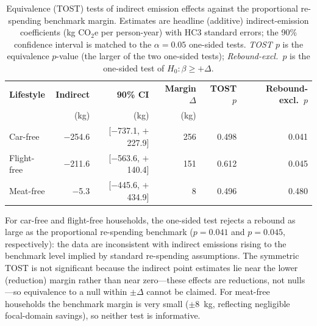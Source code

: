 \documentclass[12pt]{article}
\begin{document}
\begin{table}[!htbp]
\centering
\small
\caption{Equivalence (TOST) tests of indirect emission effects against the proportional re-spending benchmark margin. Estimates are headline (additive) indirect-emission coefficients (kg CO$_2$e per person-year) with HC3 standard errors; the 90\% confidence interval is matched to the $\alpha=0.05$ one-sided tests. \textit{TOST $p$} is the equivalence $p$-value (the larger of the two one-sided tests); \textit{Rebound-excl.\ $p$} is the one-sided test of $H_0:\beta\ge+\Delta$.}
\label{tab:equivalence}
\begin{tabular}{lrrrrr}
\toprule
\textbf{Lifestyle} & \textbf{Indirect} & \textbf{90\% CI} & \textbf{Margin $\Delta$} & \textbf{TOST $p$} & \textbf{Rebound-excl.\ $p$} \\
 & (kg) & (kg) & (kg) & & \\
\midrule
Car-free    & $-$254.6 & [$-$737.1, $+$227.9] & 256 & 0.498 & 0.041 \\
Flight-free & $-$211.6 & [$-$563.6, $+$140.4] & 151 & 0.612 & 0.045 \\
Meat-free   & $-$5.3   & [$-$445.6, $+$434.9] & 8   & 0.496 & 0.480 \\
\bottomrule
\end{tabular}
\end{table}

For car-free and flight-free households, the one-sided test rejects a rebound as large as the proportional re-spending benchmark ($p=0.041$ and $p=0.045$, respectively): the data are inconsistent with indirect emissions rising to the benchmark level implied by standard re-spending assumptions. The symmetric TOST is not significant because the indirect point estimates lie near the lower (reduction) margin rather than near zero---these effects are reductions, not nulls---so equivalence to a null within $\pm\Delta$ cannot be claimed. For meat-free households the benchmark margin is very small ($\pm$8~kg, reflecting negligible focal-domain savings), so neither test is informative.
\end{document}
